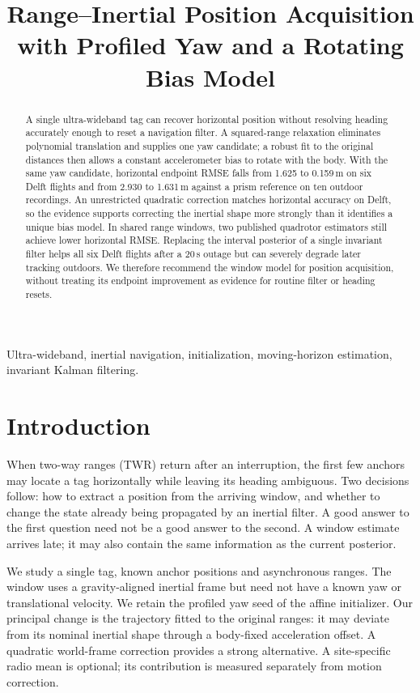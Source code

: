 \documentclass[conference,letterpaper,10pt]{IEEEtran}
\title{Range--Inertial Position Acquisition\\with Profiled Yaw and a Rotating Bias Model}
\author{\IEEEauthorblockN{Anonymous Authors}}
\begin{document}
\maketitle
\raggedbottom
\begin{abstract}
A single ultra-wideband tag can recover horizontal position without resolving heading accurately enough to reset a navigation filter. A squared-range relaxation eliminates polynomial translation and supplies one yaw candidate; a robust fit to the original distances then allows a constant accelerometer bias to rotate with the body. With the same yaw candidate, horizontal endpoint RMSE falls from 1.625 to 0.159\,m on six Delft flights and from 2.930 to 1.631\,m against a prism reference on ten outdoor recordings. An unrestricted quadratic correction matches horizontal accuracy on Delft, so the evidence supports correcting the inertial shape more strongly than it identifies a unique bias model. In shared range windows, two published quadrotor estimators still achieve lower horizontal RMSE. Replacing the interval posterior of a single invariant filter helps all six Delft flights after a 20\,s outage but can severely degrade later tracking outdoors. We therefore recommend the window model for position acquisition, without treating its endpoint improvement as evidence for routine filter or heading resets.
\end{abstract}
\begin{IEEEkeywords}
Ultra-wideband, inertial navigation, initialization, moving-horizon estimation, invariant Kalman filtering.
\end{IEEEkeywords}

\section{Introduction}
When two-way ranges (TWR) return after an interruption, the first few anchors may locate a tag horizontally while leaving its heading ambiguous. Two decisions follow: how to extract a position from the arriving window, and whether to change the state already being propagated by an inertial filter. A good answer to the first question need not be a good answer to the second. A window estimate arrives late; it may also contain the same information as the current posterior.

We study a single tag, known anchor positions and asynchronous ranges. The window uses a gravity-aligned inertial frame but need not have a known yaw or translational velocity. We retain the profiled yaw seed of the affine initializer. Our principal change is the trajectory fitted to the original ranges: it may deviate from its nominal inertial shape through a body-fixed acceleration offset. A quadratic world-frame correction provides a strong alternative. A site-specific radio mean is optional; its contribution is measured separately from motion correction.
\end{document}
